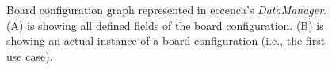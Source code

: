 \begin{figure}[H]
    \libertineLF
	\centering {}
	\caption[Board Configuration Graph in eccenca’s \textit{DataManager}]{Board configuration graph represented in eccenca’s \textit{DataManager}. (A) is showing all defined fields of the board configuration. (B) is showing an actual instance of a board configuration (i.e., the first use case).}
	\label{fig:BoardConfigs}
	\libertineOsF
\end{figure}


